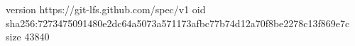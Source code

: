 version https://git-lfs.github.com/spec/v1
oid sha256:7273475091480e2dc64a5073a571173afbc77b74d12a70f8be2278c13f869e7c
size 43840
